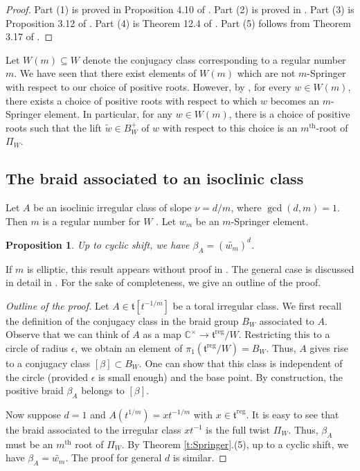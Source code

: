 \documentclass[11pt]{amsart}
\newtheorem{prop}[thm]{Proposition}
\theoremstyle{definition}
\newcommand{\ra}{\rightarrow}
\newcommand{\bC}{\mathbb{C}}
\newcommand{\ft}{\mathfrak{t}}
\begin{document}
\begin{proof} Part (1) is proved in Proposition 4.10 of \cite{Springer}. Part (2) is proved in \cite[Proposition 3.9]{BM}. Part (3) is Proposition 3.12 of \cite{BM}. Part (4) is Theorem 12.4 of \cite{BessisKPi1}. Part (5) follows from Theorem 3.17 of \cite{BM}. 
\end{proof} 


Let $W(m) \subseteq W$ denote the conjugacy class corresponding to a regular number $m$. We have seen that there exist elements of $W(m)$ which are not $m$-Springer with respect to our choice of positive roots. However, by \cite[Proposition 4.10]{Springer}, for every $w \in W(m)$, there exists a choice of positive roots with respect to which $w$ becomes an $m$-Springer element. In particular, for any $w \in W(m)$, there is a choice of positive roots such that the lift $\widetilde{w} \in B_W^+$ of $w$ with respect to this choice is an $m^{\mathrm{th}}$-root of $\Pi_W$. 



\subsection{The braid associated to an isoclinic class}

Let $A$ be an isoclinic irregular class of slope $\nu=d/m$, where $\gcd(d,m)=1$. Then $m$ is a regular number for $W$ \cite[Lemma 2.2]{JY}. 
Let $w_m$ be an  $m$-Springer element. 

\begin{prop}
Up to cyclic shift, we have $\beta_A=(\widetilde{w_m})^d$. 
\end{prop}
 

If $m$ is elliptic, this result appears without proof in \cite[\S 4.4.1]{BBAMY}. The general case  is discussed in detail in \cite{braids}. For the sake of completeness, we give an outline of the proof. 

\begin{proof}[Outline of the proof]
 Let $A\in \ft[t^{-1/m}]$ be a toral irregular class. We first recall the definition of the conjugacy class in the braid group $B_W$ associated to $A$. Observe that we can think of $A$ as a map $\bC^\times \ra \ft^{\mathrm{reg}}/W$. Restricting this to a circle of radius $\epsilon$, we obtain an element of $\pi_1(\ft^{\mathrm{reg}}/W) = B_W$. Thus, $A$ gives rise to a conjugacy class $[\beta]\subset B_W$. One can show that this  class is independent of the circle (provided $\epsilon$ is small enough) and the base point. By construction, the positive braid $\beta_A$ belongs to $[\beta]$.
 
Now suppose $d=1$ and $A(t^{1/m})=xt^{-1/m}$ with $x\in \ft^{\mathrm{reg}}$. It is easy to see that the braid associated to the irregular class $xt^{-1}$ is the full twist $\Pi_W$. Thus, $\beta_A$ must be an $m^{\text{th}}$ root of $\Pi_W$. By Theorem \ref{t:Springer}.(5), up to a cyclic shift, we have $\beta_A=\widetilde{w_m}$. The proof for general $d$ is similar. 
\end{proof} 
\end{document}
